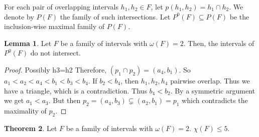 \documentclass[12pt]{article}
\theoremstyle{definition}
\newtheorem{thm}{Theorem}
\newtheorem{lemma}[thm]{Lemma}
\begin{document}
    For each pair of overlapping
    intervals $h_1, h_2 \in F$,
    let $p\left(h_1, h_2\right)
    = h_1 \cap h_2$.
    We denote by $P\left(F\right)$ 
    the family of such intersections.
    Let $P^{0}\left(F\right) \subseteq 
    P\left(F\right)$ be the
    inclusion-wise maximal family
    of $P\left(F\right)$.

    \begin{lemma} \label{lemma:4.5}
        Let $F$ be a family of
        intervals with $\omega\left(F\right)=2$.
        Then, the intervals of $P^{0}\left(F\right)$ 
        do not intersect.
    \end{lemma}
    \begin{proof}
        {Possibly h3=h2}
        Therefore, $\left(p_1 \cap p_2\right) =
        \left(a_4, b_1\right)$.
        So $a_1 < a_2 < a_4
        < b_1 <b_3 < b_4$.
        If $b_2 < b_4$,
        then $h_1, h_2, h_4$ 
        pairwise overlap. 
        Thus we have a triangle,
        which is a contradiction.
        Thus $b_4 < b_2$.
        By a symmetric argument
        we get $a_1 < a_3$.
        But then $p_2 =
        \left(a_4, b_3\right)
        \subsetneq \left(a_2, b_1\right)
        = p_1$ which contradicts
        the maximality of $p_2$.
    \end{proof}
    \begin{thm} \label{thm:circle}
        Let $F$ be a family of intervals
        with $\omega\left(F\right)=2$.
        $\chi\left(F\right) \leq 5$.         
    \end{thm}        
\end{document}
